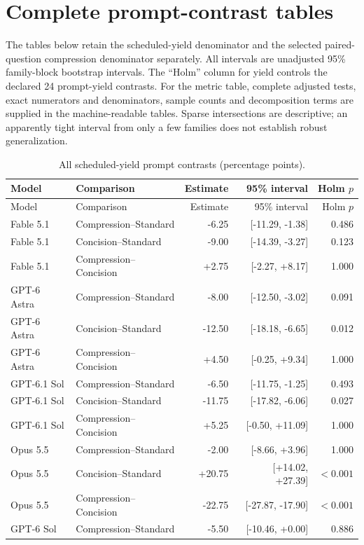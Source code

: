 \documentclass[11pt]{article}
\begin{document}
\section{Complete prompt-contrast tables}
The tables below retain the scheduled-yield denominator and the selected paired-question compression denominator separately. All intervals are unadjusted 95\% family-block bootstrap intervals. The ``Holm'' column for yield controls the declared 24 prompt-yield contrasts. For the metric table, complete adjusted tests, exact numerators and denominators, sample counts and decomposition terms are supplied in the machine-readable tables. Sparse intersections are descriptive; an apparently tight interval from only a few families does not establish robust generalization.
\small
\begin{longtable}{llrrr}
\caption{All scheduled-yield prompt contrasts (percentage points).}\label{tab:all-yield}\\
\toprule Model & Comparison & Estimate & 95\% interval & Holm $p$\\\midrule\endfirsthead
\toprule Model & Comparison & Estimate & 95\% interval & Holm $p$\\\midrule\endhead
Fable 5.1 & Compression--Standard & -6.25 & [-11.29, -1.38] & 0.486 \\
Fable 5.1 & Concision--Standard & -9.00 & [-14.39, -3.27] & 0.123 \\
Fable 5.1 & Compression--Concision & +2.75 & [-2.27, +8.17] & 1.000 \\
GPT-6 Astra & Compression--Standard & -8.00 & [-12.50, -3.02] & 0.091 \\
GPT-6 Astra & Concision--Standard & -12.50 & [-18.18, -6.65] & 0.012 \\
GPT-6 Astra & Compression--Concision & +4.50 & [-0.25, +9.34] & 1.000 \\
GPT-6.1 Sol & Compression--Standard & -6.50 & [-11.75, -1.25] & 0.493 \\
GPT-6.1 Sol & Concision--Standard & -11.75 & [-17.82, -6.06] & 0.027 \\
GPT-6.1 Sol & Compression--Concision & +5.25 & [-0.50, +11.09] & 1.000 \\
Opus 5.5 & Compression--Standard & -2.00 & [-8.66, +3.96] & 1.000 \\
Opus 5.5 & Concision--Standard & +20.75 & [+14.02, +27.39] & $<0.001$ \\
Opus 5.5 & Compression--Concision & -22.75 & [-27.87, -17.90] & $<0.001$ \\
GPT-6 Sol & Compression--Standard & -5.50 & [-10.46, +0.00] & 0.886 \\

\end{longtable}
\end{document}
